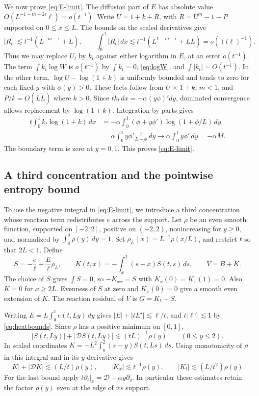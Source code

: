 \documentclass[11pt]{article}
\begin{document}
We now prove \eqref{eq:E-limit}. The diffusion part of \(E\) has
absolute value \(O(L^{-1-m-2\epsilon}\ell)=o(t^{-1})\).
Write \(U=1+k+R\), with \(R=U^m-1-P\) supported on \(0\le x\le L\).
The bounds on the scaled derivatives give
\[
 |R_t|\lesssim t^{-1}(L^{-m-\epsilon}+\dot L),\qquad
 \int_0^1 |R_t|\,dx
 \lesssim t^{-1}(L^{1-m-\epsilon}+L\dot L)=o((t\ell)^{-1}).
\]
Thus we may replace \(U_t\) by \(k_t\) against either logarithm in
\(E\), at an error \(o(t^{-1})\). The term \(\int k_t\log W\) is
\(o(t^{-1})\) by \(\int k_t=0\), \eqref{eq:logW}, and
\(\int |k_t|=O(t^{-1})\). In the other term, \(\log U-\log(1+k)\)
is uniformly bounded and tends to zero for each fixed \(y\) with
\(\phi(y)>0\). These facts follow from \(U\asymp1+k\),
\(m<1\), and \(P/k=O(L\dot L)\) where \(k>0\).
Since \(t k_t\,dx=-\alpha(y\phi)'dy\), dominated convergence
allows replacement by \(\log(1+k)\). Integration by parts gives
\[
\begin{aligned}
 t\int_0^1 k_t\log(1+k)\,dx
 &=-\alpha\int_0^1(\phi+y\phi')\log(1+\phi/L)\,dy\\
 &=\alpha\int_0^1 y\phi'\frac{\phi}{L+\phi}\,dy
 \longrightarrow\alpha\int_0^1y\phi'\,dy=-\alpha M .
\end{aligned}
\]
The boundary term is zero at \(y=0,1\). This proves \eqref{eq:E-limit}.

\subsection{A third concentration and the pointwise entropy bound}

To use the negative integral in \eqref{eq:E-limit}, we introduce a
third concentration whose reaction term redistributes \(e\) across the
support. Let \(\rho\) be an even smooth function, supported on
\([-2,2]\), positive on \((-2,2)\), nonincreasing for \(y\ge0\), and
normalized by \(\int_0^2\rho(y)\,dy=1\). Set
\(\rho_L(x)=L^{-1}\rho(x/L)\), and restrict \(t\) so that
\(2L<1\). Define
\begin{equation}
 S=-\frac{e}{\ell}+\frac{E}{\ell}\rho_L,\qquad
 K(t,x)=-\int_x^1(s-x)S(t,s)\,ds,\qquad V=B+K .
 \label{eq:reservoir}
\end{equation}
The choice of \(S\) gives \(\int S=0\), so \(-K_{xx}=S\) with
\(K_x(0)=K_x(1)=0\). Also \(K=0\) for \(x\ge2L\).
Evenness of \(S\) at zero and \(K_x(0)=0\) give a smooth even
extension of \(K\). The reaction residual of \(V\) is \(G=K_t+S\).

Writing \(E=L\int_0^1 e(t,Ly)\,dy\) gives
\(|E|+|tE'|\lesssim \ell/t\), and \(t|\ell'|\lesssim1\) by
\eqref{eq:heatbounds}. Since \(\rho\) has a positive minimum on
\([0,1]\),
\[
 |S(t,Ly)|+|\mathcal D S(t,Ly)|\lesssim (tL)^{-1}\rho(y)
 \qquad (0\le y\le 2).
\]
In scaled coordinates \(K=-L^2\int_y^2(s-y)S(t,Ls)\,ds\).
Using monotonicity of \(\rho\) in this integral and in its \(y\)
derivative gives
\begin{equation}
 |K|+|\mathcal D K|\lesssim (L/t)\rho(y),\qquad
 |K_x|\lesssim t^{-1}\rho(y),\qquad
 |K_t|\lesssim (L/t^2)\rho(y).
 \label{eq:Kbounds}
\end{equation}
For the last bound apply
\(t\partial_t|_x=\mathcal D-\alpha y\partial_y\).
In particular these estimates retain the factor \(\rho(y)\) even
at the edge of its support.
\end{document}
